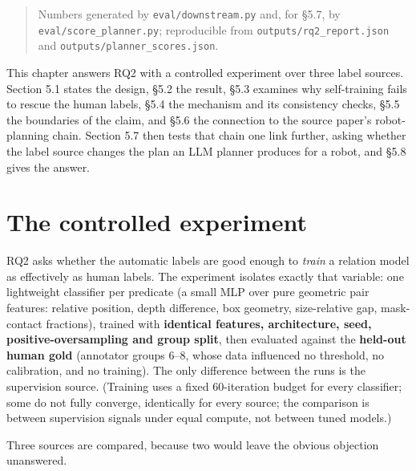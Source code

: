 
\begin{quote}
Numbers generated by \texttt{eval/downstream.py} and, for \S5.7, by \texttt{eval/score\_planner.py}; reproducible from \texttt{outputs/rq2\_report.json} and \texttt{outputs/planner\_scores.json}.
\end{quote}

This chapter answers RQ2 with a controlled experiment over three label sources. Section 5.1 states the design, \S5.2 the result, \S5.3 examines why self-training fails to rescue the human labels, \S5.4 the mechanism and its consistency checks, \S5.5 the boundaries of the claim, and \S5.6 the connection to the source paper's robot-planning chain. Section 5.7 then tests that chain one link further, asking whether the label source changes the plan an LLM planner produces for a robot, and \S5.8 gives the answer.

\section{The controlled experiment}

RQ2 asks whether the automatic labels are good enough to \textit{train} a relation model as effectively as human labels. The experiment isolates exactly that variable: one lightweight classifier per predicate (a small MLP over pure geometric pair features: relative position, depth difference, box geometry, size-relative gap, mask-contact fractions), trained with \textbf{identical features, architecture, seed, positive-oversampling and group split}, then evaluated against the \textbf{held-out human gold} (annotator groups 6--8, whose data influenced no threshold, no calibration, and no training). The only difference between the runs is the supervision source. (Training uses a fixed 60-iteration budget for every classifier; some do not fully converge, identically for every source; the comparison is between supervision signals under equal compute, not between tuned models.)

Three sources are compared, because two would leave the obvious objection unanswered.

